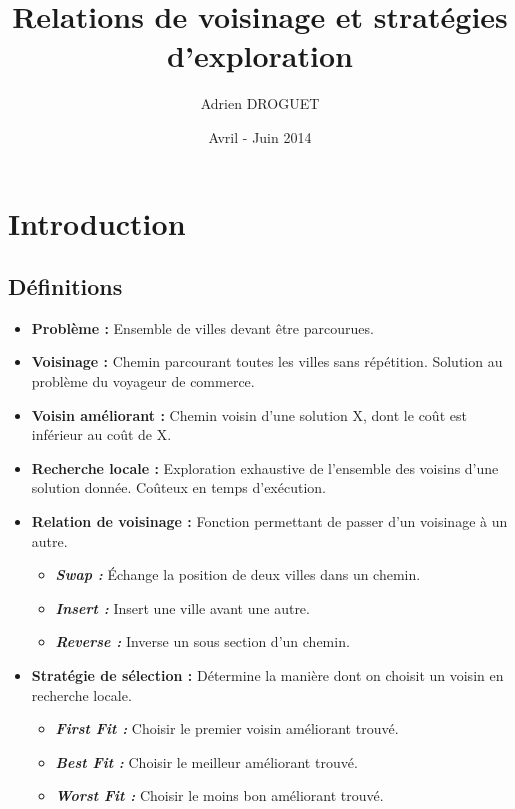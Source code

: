\documentclass[a4paper,10pt]{report}
\title{Relations de voisinage et stratégies d'exploration}
\author{Adrien DROGUET}
\date{Avril - Juin 2014}
\begin{document}
\maketitle

\tableofcontents
\pagebreak

\chapter*{Introduction}
\section*{Définitions}
\begin{itemize}
 \item \textbf{Problème :} Ensemble de villes devant être parcourues.
 \item \textbf{Voisinage :} Chemin parcourant toutes les villes sans répétition.
Solution au problème du voyageur de commerce.
 \item \textbf{Voisin améliorant :} Chemin voisin d'une solution X, dont le coût
est inférieur au coût de X.
 \item \textbf{Recherche locale :} Exploration exhaustive de l'ensemble des
voisins d'une solution donnée.
 Coûteux en temps d'exécution.
 \item \textbf{Relation de voisinage :} Fonction permettant de passer d'un
voisinage à un autre.
 \begin{itemize}
  \item \textit{\textbf{Swap :}} Échange la position de deux villes dans un
chemin.
  \item \textit{\textbf{Insert :}} Insert une ville avant une autre.
  \item \textit{\textbf{Reverse :}} Inverse un sous section d'un chemin.
 \end{itemize}
 \item \textbf{Stratégie de sélection :} Détermine la manière dont on choisit un
voisin en recherche locale.
 \begin{itemize}
  \item \textit{\textbf{First Fit :}} Choisir le premier voisin améliorant
trouvé.
  \item \textit{\textbf{Best Fit :}} Choisir le meilleur améliorant trouvé.
  \item \textit{\textbf{Worst Fit :}} Choisir le moins bon améliorant trouvé.
 \end{itemize}
\end{itemize}
\end{document}

